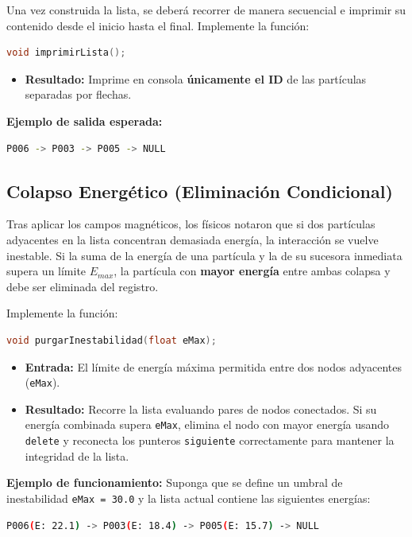 \documentclass[11pt, letterpaper]{article}
\begin{document}
Una vez construida la lista, se deberá recorrer de manera secuencial e imprimir su contenido desde el inicio hasta el final. Implemente la función:
\begin{lstlisting}[language=C++]
void imprimirLista();
\end{lstlisting}
\begin{itemize}[noitemsep, topsep=0pt]
    \item \textbf{Resultado:} Imprime en consola \textbf{únicamente el ID} de las partículas separadas por flechas.
\end{itemize}
\textbf{Ejemplo de salida esperada:}
\begin{lstlisting}[language=bash]
P006 -> P003 -> P005 -> NULL
\end{lstlisting}

\subsection{Colapso Energético (Eliminación Condicional)}
Tras aplicar los campos magnéticos, los físicos notaron que si dos partículas adyacentes en la lista concentran demasiada energía, la interacción se vuelve inestable. Si la suma de la energía de una partícula y la de su sucesora inmediata supera un límite $E_{max}$, la partícula con \textbf{mayor energía} entre ambas colapsa y debe ser eliminada del registro.

Implemente la función:
\begin{lstlisting}[language=C++]
void purgarInestabilidad(float eMax);
\end{lstlisting}
\begin{itemize}[noitemsep, topsep=0pt]
    \item \textbf{Entrada:} El límite de energía máxima permitida entre dos nodos adyacentes (\texttt{eMax}).
    \item \textbf{Resultado:} Recorre la lista evaluando pares de nodos conectados. Si su energía combinada supera \texttt{eMax}, elimina el nodo con mayor energía usando \texttt{delete} y reconecta los punteros \texttt{siguiente} correctamente para mantener la integridad de la lista.
\end{itemize}

\textbf{Ejemplo de funcionamiento:}
Suponga que se define un umbral de inestabilidad \texttt{eMax = 30.0} y la lista actual contiene las siguientes energías:
\begin{lstlisting}[language=bash]
P006(E: 22.1) -> P003(E: 18.4) -> P005(E: 15.7) -> NULL
\end{lstlisting}
\end{document}
